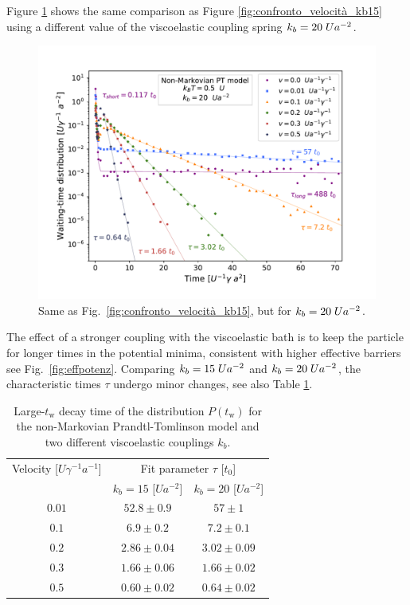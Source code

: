 Figure \ref{fig:confronto_velocità_kb20} shows the same comparison as Figure \ref{fig:confronto_velocità_kb15} using a different value of the viscoelastic coupling spring $k_b=20\hspace{0.1cm}Ua^{-2}$.
\begin{figure}
    \centering
    \includegraphics[width=\textwidth]{istogramma_confronto_kb20_def.pdf}
    \caption{Same as Fig.~\ref{fig:confronto_velocità_kb15}, but for $k_b=20\hspace{0.1cm}Ua^{-2}$.}
    \label{fig:confronto_velocità_kb20}
\end{figure}
The effect of a stronger coupling with the viscoelastic bath is to keep the particle for longer times in the potential minima, consistent with higher effective barriers see Fig.~\ref{fig:effpotenz}. Comparing $k_b=15\hspace{0.1cm}Ua^{-2}$ and $k_b=20\hspace{0.1cm}Ua^{-2}$, the characteristic times $\tau$ undergo minor changes, see also Table \ref{tab:tau}.
\begin{table}
\centering 
\begin{tabular}{ccc}
    \toprule
    Velocity [$U \gamma ^{-1} a^{-1}$] & \multicolumn{2}{c}{Fit parameter $\tau$  [$t_0$]} \\
    \cmidrule(lr){2-3}
    & $k_b = 15$  [$Ua^{-2}$]& $k_b = 20$  [$Ua^{-2}$] \\
    \midrule 
    $0.01$ & $52.8\pm 0.9$ & $57 \pm 1$\\
    $0.1$ & $6.9 \pm 0.2$ & $7.2 \pm 0.1$\\
    $0.2$ & $2.86\pm 0.04$ &$3.02 \pm 0.09$\\
    $0.3$ & $1.66\pm 0.06$  &$1.66 \pm 0.02$\\
    $0.5$ & $0.60 \pm 0.02$  &$0.64 \pm 0.02$\\
    \bottomrule
\end{tabular}
\caption{Large-$t_\text{w}$ decay time of the distribution $P(t_\text{w})$ for the non-Markovian Prandtl-Tomlinson model and two different viscoelastic couplings $k_b$.}
\label{tab:tau}
\end{table}
